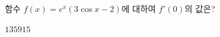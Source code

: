 함수 $f(x)=e^x(3\cos x-2)$에 대하여 $f'(0)$의 값은?
\begin{choices32}{$1$}{$3$}{$5$}{$9$}{$15$}\end{choices32}
